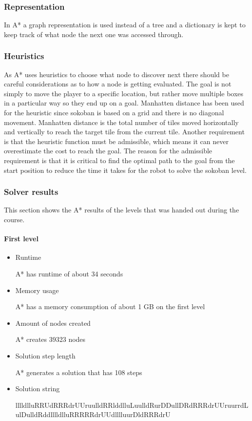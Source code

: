 \documentclass[../../maint.tex]{subfiles}
\begin{document}
\subsubsection{Representation}

In A* a graph representation is used instead of a tree and a dictionary is kept to keep track of what node the next one was accessed through.

\subsubsection{Heuristics}

As A* uses heuristics to choose what node to discover next there should be careful considerations as to how a node is 			getting evaluated. The goal is not simply to move the player to a specific location, but rather move multiple boxes in a particular way so they end up on a goal.
Manhatten distance has been used for the heuristic since sokoban is based on a grid and there is no diagonal movement. 			Manhatten distance is the total number of tiles moved horizontally and vertically to reach the target tile from the 			current tile. Another requirement is that the heuristic function must be admissible, which means it can never overestimate 	the cost to reach the goal. The reason for the admissible requirement is that it is critical to find the optimal path to the goal from the start position to reduce the time it takes for the robot to solve the sokoban level.

\subsubsection{Solver results}

This section shows the A* results of the levels that was handed out during the course.

\paragraph{First level}

 \begin{itemize}

	\item Runtime 		
 		
 	A* has runtime of about 34 seconds
 		
	\item Memory usage
		
	A* has a memory consumption of about 1 GB on the first level
	
	\item Amount of nodes created
	
	A* creates 39323 nodes
	
	\item Solution step length
	
	A* generates a solution that has 108 steps
	
	\item Solution string
	
	lllldlluRRUdRRRdrUUruulldRRlddlluLuulldRurDDullDRdRRRdrUUruurrdLulDulldRddlllldlluRRRRRdrUUdlllluurDldRRRdrU
		
 \end{itemize}
	
\end{document}
